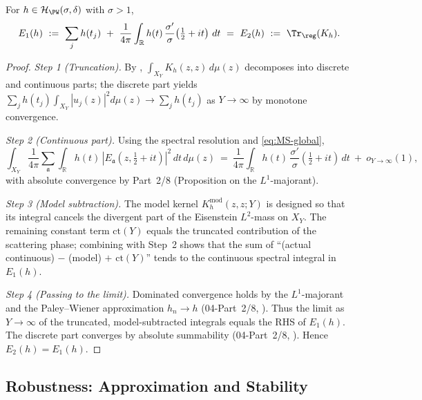 \begin{theorem}[Spectral = geometric regularized trace]\label{thm:E1eqE2}\relax
For $h\in\mathcal{H}_{\PW}(\sigma,\delta)$ with $\sigma>1$,
\[
E_{1}(h)\ :=\ \sum_{j}h(t_j)\ +\ \frac{1}{4\pi}\int_{\mathbb{R}}h(t)\,\frac{\sigma'}{\sigma}\!\left(\tfrac12+it\right)\,dt
\ =\ E_{2}(h)\ :=\ \Tr_{\reg}(K_h).
\]
\end{theorem}

\begin{proof}\relax
\emph{Step 1 (Truncation).} By , $\int_{X_Y}K_h(z,z)\,d\mu(z)$ decomposes into discrete and continuous parts; the discrete part yields $\sum_j h(t_j)\int_{X_Y}|u_j(z)|^2d\mu(z)\to \sum_j h(t_j)$ as $Y\to\infty$ by monotone convergence. %

\emph{Step 2 (Continuous part).} Using the spectral resolution and \eqref{eq:MS-global},
\[
\int_{X_Y}\frac{1}{4\pi}\sum_{\mathfrak{a}}\int_{\mathbb{R}} h(t)\,
|E_{\mathfrak{a}}(z,\tfrac12+it)|^2\,dt\,d\mu(z)
\ =\ \frac{1}{4\pi}\int_{\mathbb{R}}h(t)\,\frac{\sigma'}{\sigma}\!\left(\tfrac12+it\right)\,dt\ +\ o_{Y\to\infty}(1),
\]
with absolute convergence by Part~2/8 (Proposition on the $L^1$-majorant). %

\emph{Step 3 (Model subtraction).} The model kernel $K_h^{\mathrm{mod}}(z,z;Y)$ is designed so that its integral cancels the divergent part of the Eisenstein $L^2$-mass on $X_Y$. The remaining constant term $\mathrm{ct}(Y)$ equals the truncated contribution of the scattering phase; combining with Step~2 shows that the sum of ``(actual continuous) $-$ (model) $+$ $\mathrm{ct}(Y)$'' tends to the continuous spectral integral in $E_1(h)$. %

\emph{Step 4 (Passing to the limit).} Dominated convergence holds by the $L^1$-majorant and the Paley–Wiener approximation $h_n\to h$ (04-Part~2/8, ). Thus the limit as $Y\to\infty$ of the truncated, model-subtracted integrals equals the RHS of $E_{1}(h)$. The discrete part converges by absolute summability (04-Part~2/8, ). Hence $E_{2}(h)=E_{1}(h)$. %
\end{proof}

\subsection{Robustness: Approximation and Stability}\relax\hspace{0pt}
\label{subsec:robustness}\relax\hspace{0pt}

